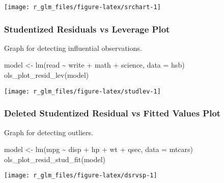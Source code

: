 \documentclass[
]{article}
\newenvironment{Shaded}{\begin{snugshade}}{\end{snugshade}}
\newcommand{\AttributeTok}[1]{\textcolor[rgb]{0.77,0.63,0.00}{#1}}
\newcommand{\FunctionTok}[1]{\textcolor[rgb]{0.00,0.00,0.00}{#1}}
\newcommand{\NormalTok}[1]{#1}
\newcommand{\OtherTok}[1]{\textcolor[rgb]{0.56,0.35,0.01}{#1}}
\newcommand{\SpecialCharTok}[1]{\textcolor[rgb]{0.00,0.00,0.00}{#1}}
\begin{document}
\begin{center}\texttt{[image: r\_glm\_files/figure-latex/srchart-1]} \end{center}

\hypertarget{studentized-residuals-vs-leverage-plot}{%
\subsubsection{Studentized Residuals vs Leverage
Plot}\label{studentized-residuals-vs-leverage-plot}}

Graph for detecting influential observations.

\begin{Shaded}
\begin{Highlighting}[]
\NormalTok{model }\OtherTok{\textless{}{-}} \FunctionTok{lm}\NormalTok{(read }\SpecialCharTok{\textasciitilde{}}\NormalTok{ write }\SpecialCharTok{+}\NormalTok{ math }\SpecialCharTok{+}\NormalTok{ science, }\AttributeTok{data =}\NormalTok{ hsb)}
\FunctionTok{ols\_plot\_resid\_lev}\NormalTok{(model)}
\end{Highlighting}
\end{Shaded}

\begin{center}\texttt{[image: r\_glm\_files/figure-latex/studlev-1]} \end{center}

\hypertarget{deleted-studentized-residual-vs-fitted-values-plot}{%
\subsubsection{Deleted Studentized Residual vs Fitted Values
Plot}\label{deleted-studentized-residual-vs-fitted-values-plot}}

Graph for detecting outliers.

\begin{Shaded}
\begin{Highlighting}[]
\NormalTok{model }\OtherTok{\textless{}{-}} \FunctionTok{lm}\NormalTok{(mpg }\SpecialCharTok{\textasciitilde{}}\NormalTok{ disp }\SpecialCharTok{+}\NormalTok{ hp }\SpecialCharTok{+}\NormalTok{ wt }\SpecialCharTok{+}\NormalTok{ qsec, }\AttributeTok{data =}\NormalTok{ mtcars)}
\FunctionTok{ols\_plot\_resid\_stud\_fit}\NormalTok{(model)}
\end{Highlighting}
\end{Shaded}

\begin{center}\texttt{[image: r\_glm\_files/figure-latex/dsrvsp-1]} \end{center}
\end{document}

